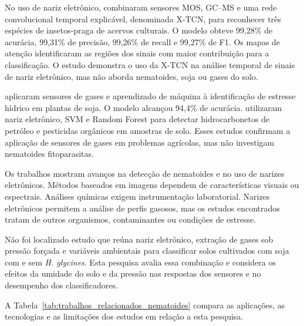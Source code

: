 No uso de nariz eletrônico, \cite{chen2026xtcn} combinaram sensores MOS, GC--MS
e uma rede convolucional temporal explicável, denominada X-TCN, para reconhecer
três espécies de insetos-praga de acervos culturais. O modelo obteve 99,28\% de
acurácia, 99,31\% de precisão, 99,26\% de recall e 99,27\% de F1. Os mapas de
atenção identificaram as regiões dos sinais com maior contribuição para a
classificação. O estudo demonstra o uso da X-TCN na análise temporal de sinais
de nariz eletrônico, mas não aborda nematoides, soja ou gases do solo.

\cite{herrmann2024} aplicaram sensores de gases e aprendizado de máquina à
identificação de estresse hídrico em plantas de soja. O modelo alcançou 94,4\%
de acurácia. \cite{kong2025} utilizaram nariz eletrônico, SVM e Random Forest
para detectar hidrocarbonetos de petróleo e pesticidas orgânicos em amostras
de solo. Esses estudos confirmam a aplicação de sensores de gases em problemas
agrícolas, mas não investigam nematoides fitoparasitas.

Os trabalhos mostram avanços na detecção de nematoides e no uso de narizes
eletrônicos. Métodos baseados em imagens dependem de características visuais ou
espectrais. Análises químicas exigem instrumentação laboratorial. Narizes
eletrônicos permitem a análise de perfis gasosos, mas os estudos encontrados
tratam de outros organismos, contaminantes ou condições de estresse.

Não foi localizado estudo que reúna nariz eletrônico, extração de gases sob
pressão forçada e variáveis ambientais para classificar solos cultivados com
soja com e sem \textit{H. glycines}. Esta pesquisa avalia essa combinação e
considera os efeitos da umidade do solo e da pressão nas respostas dos sensores
e no desempenho dos classificadores.

A Tabela~\ref{tab:trabalhos_relacionados_nematoides} compara as aplicações, as
tecnologias e as limitações dos estudos em relação a esta pesquisa.

\clearpage

